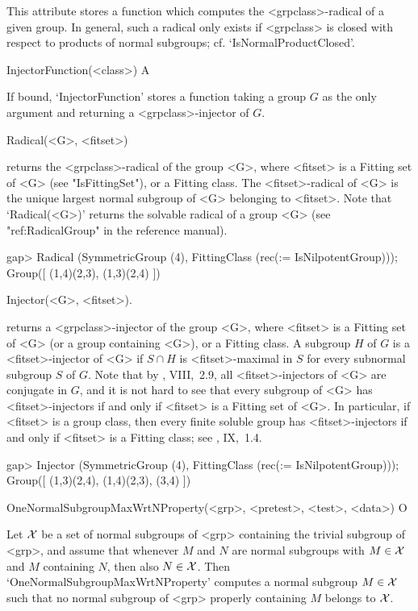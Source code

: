 This attribute stores a function which computes the <grpclass>-radical of a
given group. In general, such a radical only exists if <grpclass> is closed
with respect to products of normal subgroups; cf. `IsNormalProductClosed'.

\>InjectorFunction(<class>) A

If bound, `InjectorFunction' stores a function taking a group $G$ as the
only argument and returning a <grpclass>-injector of $G$.


\>Radical(<G>,  <fitset>)

%
%
returns the <grpclass>-radical of the group <G>, where
<fitset> is a Fitting set of <G> (see "IsFittingSet"), or a Fitting
class. The <fitset>-radical of <G> is the unique largest normal subgroup
of <G> belonging to <fitset>. Note that `Radical(<G>)' returns the solvable
radical of a group <G> (see "ref:RadicalGroup" in the {\GAP} reference
manual).

\beginexample
gap> Radical (SymmetricGroup (4), FittingClass (rec(\in := IsNilpotentGroup)));
Group([ (1,4)(2,3), (1,3)(2,4) ])
\endexample

\>Injector(<G>, <fitset>).

returns a <grpclass>-injector of the group <G>, where <fitset> is a
Fitting set of <G> (or a group containing <G>), or a Fitting class. A
subgroup $H$ of $G$ is a <fitset>-injector of <G> if $S \cap H$ is
<fitset>-maximal in $S$ for every subnormal subgroup $S$ of $G$. Note that by 
\cite{DH1992}, VIII,~2.9, all <fitset>-injectors of <G> are conjugate in $G$,
and it is not hard to see that every subgroup of <G> has <fitset>-injectors
if and only if <fitset> is a Fitting set of <G>. In particular, if <fitset>
is a group class, then every finite
soluble group has <fitset>-injectors if and only if <fitset> is a Fitting class;
see \cite{DH1992}, IX,~1.4.

\beginexample
gap> Injector (SymmetricGroup (4), FittingClass (rec(\in := IsNilpotentGroup)));
Group([ (1,3)(2,4), (1,4)(2,3), (3,4) ])
\endexample




\>OneNormalSubgroupMaxWrtNProperty(<grp>, <pretest>, <test>, <data>) O

Let $\cal X$ be a set of normal subgroups of <grp> containing the trivial
subgroup of <grp>, and assume that whenever
$M$ and $N$ are normal subgroups with $M \in \cal X$ and $M$
containing $N$, then also $N \in \cal X$. Then
`OneNormalSubgroupMaxWrtNProperty' computes a normal subgroup $M \in \cal X$
such that no normal subgroup of <grp> properly containing $M$ belongs to $\cal
X$. 

